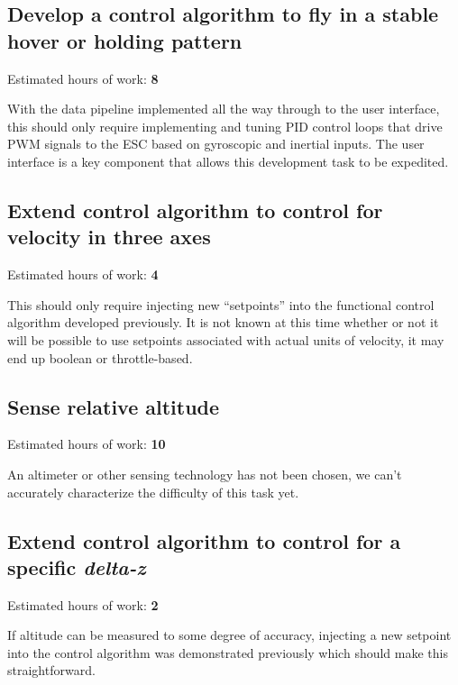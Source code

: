 \documentclass{article}
\begin{document}
\subsection{Develop a control algorithm to fly in a stable hover or holding pattern}

Estimated hours of work: \textbf{8}
\vspace{0.25cm}

\noindent
With the data pipeline implemented all the way through to the user interface,
this should only require implementing and tuning PID control loops that
drive PWM signals to the ESC based on gyroscopic and inertial inputs.
The user interface is a key component that allows this development task
to be expedited.

\subsection{Extend control algorithm to control for velocity in three axes}

Estimated hours of work: \textbf{4}
\vspace{0.25cm}

\noindent
This should only require injecting new ``setpoints'' into the functional
control algorithm developed previously. It is not known at this time whether
or not it will be possible to use setpoints associated with actual units of
velocity, it may end up boolean or throttle-based.

\subsection{Sense relative altitude}

Estimated hours of work: \textbf{10}
\vspace{0.25cm}

\noindent
An altimeter or other sensing technology has not been chosen, we can't
accurately characterize the difficulty of this task yet.

\subsection{Extend control algorithm to control for a specific \textit{delta-z} }

Estimated hours of work: \textbf{2}
\vspace{0.25cm}

\noindent
If altitude can be measured to some degree of accuracy, injecting a new
setpoint into the control algorithm was demonstrated previously which should
make this straightforward.
\end{document}
